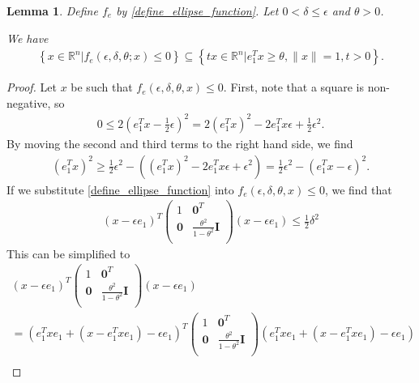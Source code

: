 \documentclass{article}
\newtheorem{lemma}[theorem]{Lemma}
\theoremstyle{case}
\numberwithin{theorem}{subsection}
\newcommand{\Rn}{\mathbb R^n}
\begin{document}
\begin{lemma}
\label{ellipse_in_cone}
Define $f_e$ by \cref{define_ellipse_function}.
Let $0 < \delta \le \epsilon$ and $\theta > 0$.

We have
\begin{align*}
\left\{x \in \Rn | f_e(\epsilon, \delta, \theta; x) \le 0\right\} \subseteq \left\{tx\in\Rn| e_1^T x \ge \theta,\|x\|=1, t>0\right\}.
\end{align*}
\end{lemma}

\begin{proof}
Let $x$ be such that $f_e(\epsilon, \delta, \theta, x) \le 0$.
First, note that a square is non-negative, so
\begin{align*}
0 \le 2(e_1^Tx - \frac 1 2 \epsilon )^2
= 2(e_1^Tx)^2 - 2e_1^Tx\epsilon + \frac 1 2 \epsilon^2.
\end{align*}
By moving the second and third terms to the right hand side, we find
\begin{align}
(e_1^Tx)^2 \ge \frac 1 2 \epsilon^2 - \left((e_1^Tx)^2 - 2e_1^Tx\epsilon + \epsilon^2\right) 
= \frac 1 2 \epsilon^2 - (e_1^Tx - \epsilon)^2. \label{ellipse_in_cone_eqn1}
\end{align}
If we substitute \cref{define_ellipse_function} into $f_e(\epsilon, \delta, \theta, x) \le 0$, we find that
\begin{align*}
(x - \epsilon e_1)^T\begin{pmatrix}
1 & \boldsymbol0^T \\
\boldsymbol 0 & \frac{\theta^2}{1 - \theta^2} \boldsymbol I \\
\end{pmatrix}(x - \epsilon e_1) \le \frac 1 2 \delta^2
\end{align*}
This can be simplified to
\begin{align*}
(x - \epsilon e_1)^T\begin{pmatrix}
1 & \boldsymbol0^T \\
\boldsymbol 0 & \frac{\theta^2}{1 - \theta^2} \boldsymbol I \\
\end{pmatrix}(x - \epsilon e_1) \\
 = (e_1^Txe_1 + (x - e_1^Txe_1) - \epsilon e_1)^T\begin{pmatrix}
1 & \boldsymbol0^T \\
\boldsymbol 0 & \frac{\theta^2}{1 - \theta^2} \boldsymbol I \\
\end{pmatrix}(e_1^Txe_1 + (x - e_1^Txe_1) - \epsilon e_1)  \\

\end{align*}
\end{proof}
\end{document}
